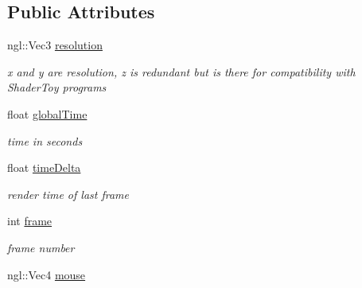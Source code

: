 \subsection*{Public Attributes}
\begin{DoxyCompactItemize}
\item 
\hypertarget{struct_shader_variables_a631f19e4de61bae969179642075e0a0b}{ngl\-::\-Vec3 \hyperlink{struct_shader_variables_a631f19e4de61bae969179642075e0a0b}{resolution}}\label{struct_shader_variables_a631f19e4de61bae969179642075e0a0b}

\begin{DoxyCompactList}\small\item\em x and y are resolution, z is redundant but is there for compatibility with Shader\-Toy programs \end{DoxyCompactList}\item 
\hypertarget{struct_shader_variables_a9dd04ab3efdd62bf3658f3b7bc8bc16e}{float \hyperlink{struct_shader_variables_a9dd04ab3efdd62bf3658f3b7bc8bc16e}{global\-Time}}\label{struct_shader_variables_a9dd04ab3efdd62bf3658f3b7bc8bc16e}

\begin{DoxyCompactList}\small\item\em time in seconds \end{DoxyCompactList}\item 
\hypertarget{struct_shader_variables_a04f3ebdad791f0531244c4fa92cda235}{float \hyperlink{struct_shader_variables_a04f3ebdad791f0531244c4fa92cda235}{time\-Delta}}\label{struct_shader_variables_a04f3ebdad791f0531244c4fa92cda235}

\begin{DoxyCompactList}\small\item\em render time of last frame \end{DoxyCompactList}\item 
\hypertarget{struct_shader_variables_aba75a7ac7c3275a20820f70ef1673e79}{int \hyperlink{struct_shader_variables_aba75a7ac7c3275a20820f70ef1673e79}{frame}}\label{struct_shader_variables_aba75a7ac7c3275a20820f70ef1673e79}

\begin{DoxyCompactList}\small\item\em frame number \end{DoxyCompactList}\item 
\hypertarget{struct_shader_variables_ae0d2905374bbfa93be88f3671e3678d0}{ngl\-::\-Vec4 \hyperlink{struct_shader_variables_ae0d2905374bbfa93be88f3671e3678d0}{mouse}}\label{struct_shader_variables_ae0d2905374bbfa93be88f3671e3678d0}


\end{DoxyCompactItemize}
